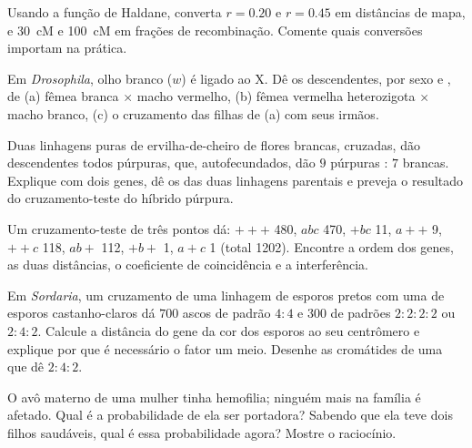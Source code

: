 \begin{exercise}[$\star\star$]\label{exo:b2:meiosis-heredity:7}
Usando a função de Haldane, converta $r = 0.20$ e $r = 0.45$ em
distâncias de mapa, e \qty{30}{cM} e \qty{100}{cM} em frações de
recombinação. Comente quais conversões importam na prática.
\end{exercise}

\begin{exercise}[$\star\star$]\label{exo:b2:meiosis-heredity:8}
Em \emph{Drosophila}, olho branco ($w$) é  ligado ao X. Dê os
descendentes, por sexo e , de (a) fêmea branca $\times$ macho
vermelho, (b) fêmea vermelha heterozigota $\times$ macho branco, (c) o
cruzamento das filhas de (a) com seus irmãos.
\end{exercise}

\begin{exercise}[$\star\star$]\label{exo:b2:meiosis-heredity:9}
Duas linhagens puras de ervilha-de-cheiro de flores brancas, cruzadas,
dão descendentes todos púrpuras, que, autofecundados, dão $9$
púrpuras : $7$ brancas. Explique com dois genes, dê os  das duas
linhagens parentais e preveja o resultado do cruzamento-teste do
híbrido púrpura.
\end{exercise}

\begin{exercise}[$\star\star\star$]\label{exo:b2:meiosis-heredity:10}
Um cruzamento-teste de três pontos dá: $+++$ 480, $abc$ 470, $+bc$ 11,
$a++$ 9, $++c$ 118, $ab+$ 112, $+b+$ 1, $a+c$ 1 (total 1202).
Encontre a ordem dos genes, as duas distâncias, o coeficiente de
coincidência e a interferência.
\end{exercise}

\begin{exercise}[$\star\star\star$]\label{exo:b2:meiosis-heredity:11}
Em \emph{Sordaria}, um cruzamento de uma linhagem de esporos pretos
com uma de esporos castanho-claros dá $700$ ascos de padrão $4 : 4$ e
$300$ de padrões $2 : 2 : 2 : 2$ ou $2 : 4 : 2$. Calcule a distância
do gene da cor dos esporos ao seu centrômero e explique por que é
necessário o fator um meio. Desenhe as cromátides de uma  que dê
$2 : 4 : 2$.
\end{exercise}

\begin{exercise}[$\star\star\star$]\label{exo:b2:meiosis-heredity:12}
O avô materno de uma mulher tinha hemofilia; ninguém mais na família é
afetado. Qual é a probabilidade de ela ser portadora? Sabendo que ela
teve dois filhos saudáveis, qual é essa probabilidade agora? Mostre o
raciocínio.
\end{exercise}

